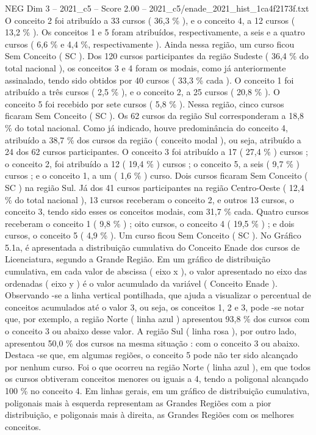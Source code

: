 \begin{textsample}{NEG Dim 3 – 2021\_c5 – Score 2.00 – 2021\_c5/enade\_2021\_hist\_1ca4f2173f.txt}
O conceito 2 foi atribuído a 33 cursos ( 36,3 \% ), e o conceito 4, a 12 cursos ( 13,2 \% ).
Os conceitos 1 e 5 foram atribuídos, respectivamente, a seis e a quatro cursos ( 6,6 \% e 4,4 \%, respectivamente ).
Ainda nessa região, um curso ficou Sem Conceito ( SC ).
Dos 120 cursos participantes da região Sudeste ( 36,4 \% do total nacional ), os conceitos 3 e 4 foram os modais, como já anteriormente assinalado, tendo sido obtidos por 40 cursos ( 33,3 \% cada ).
O conceito 1 foi atribuído a três cursos ( 2,5 \% ), e o conceito 2, a 25 cursos ( 20,8 \% ).
O conceito 5 foi recebido por sete cursos ( 5,8 \% ).
Nessa região, cinco cursos ficaram Sem Conceito ( SC ).
Os 62 cursos da região Sul corresponderam a 18,8 \% do total nacional.
Como já indicado, houve predominância do conceito 4, atribuído a 38,7 \% dos cursos da região ( conceito modal ), ou seja, atribuído a 24 dos 62 cursos participantes.
O conceito 3 foi atribuído a 17 ( 27,4 \% ) cursos ; o conceito 2, foi atribuído a 12 ( 19,4 \% ) cursos ; o conceito 5, a seis ( 9,7 \% ) cursos ; e o conceito 1, a um ( 1,6 \% ) curso.
Dois cursos ficaram Sem Conceito ( SC ) na região Sul.
Já dos 41 cursos participantes na região Centro-Oeste ( 12,4 \% do total nacional ), 13 cursos receberam o conceito 2, e outros 13 cursos, o conceito 3, tendo sido esses os conceitos modais, com 31,7 \% cada.
Quatro cursos receberam o conceito 1 ( 9,8 \% ) ; oito cursos, o conceito 4 ( 19,5 \% ) ; e dois cursos, o conceito 5 ( 4,9 \% ).
Um curso ficou Sem Conceito ( SC ).
No Gráfico 5.1a, é apresentada a distribuição cumulativa do Conceito Enade dos cursos de Licenciatura, segundo a Grande Região.
Em um gráfico de distribuição cumulativa, em cada valor de abscissa ( eixo x ), o valor apresentado no eixo das ordenadas ( eixo y ) é o valor acumulado da variável ( Conceito Enade ).
Observando -se a linha vertical pontilhada, que ajuda a visualizar o percentual de conceitos acumulados até o valor 3, ou seja, os conceitos 1, 2 e 3, pode -se notar que, por exemplo, a região Norte ( linha azul ) apresentou 93,8 \% dos cursos com o conceito 3 ou abaixo desse valor.
A região Sul ( linha rosa ), por outro lado, apresentou 50,0 \% dos cursos na mesma situação : com o conceito 3 ou abaixo.
Destaca -se que, em algumas regiões, o conceito 5 pode não ter sido alcançado por nenhum curso.
Foi o que ocorreu na região Norte ( linha azul ), em que todos os cursos obtiveram conceitos menores ou iguais a 4, tendo a poligonal alcançado 100 \% no conceito 4.
Em linhas gerais, em um gráfico de distribuição cumulativa, poligonais mais à esquerda representam as Grandes Regiões com a pior distribuição, e poligonais mais à direita, as Grandes Regiões com os melhores conceitos.

\end{textsample}
